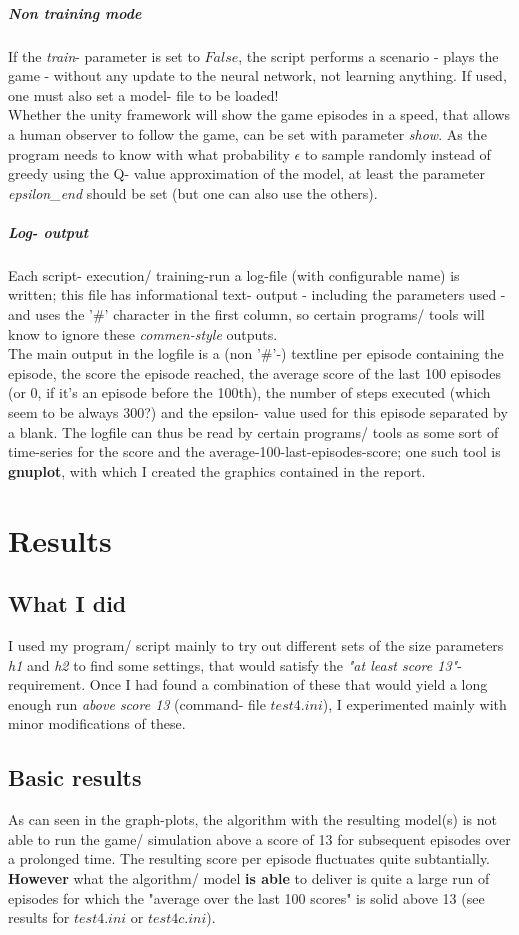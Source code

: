 \documentclass{article}
\begin{document}
\subparagraph{Non training mode}
If the \textit{train}- parameter is set to $False$, the script performs
a scenario - plays the game - without any update to the neural network,
not learning anything. If used, one must also set a model- file to be loaded!
\\
Whether the unity framework will show the game episodes in a speed, that allows
a human observer to follow the game, can be set with parameter \textit{show}.
As the program needs to know with what probability $\epsilon$ to sample randomly
instead of greedy using the Q- value approximation of the model, at least
the parameter \textit{epsilon\_end} should be set (but one can also use the
others).

\subparagraph{Log- output}
Each script- execution/ training-run a log-file (with configurable name) is
written; this file has informational text- output - including the parameters used -
and uses the '\#' character in the first column, so certain programs/ tools will
know to ignore these \textit{commen-style} outputs.
\\
The main output in the logfile is a (non '\#'-) textline per episode containing
the episode, the score the episode reached, the average score of the last 100
episodes (or 0, if it's an episode before the 100th), the number of steps executed
(which seem to be always 300?) and the epsilon- value used for this episode
separated by a blank.
The logfile can thus be read by certain programs/ tools as some sort
of time-series for the score and the average-100-last-episodes-score; one such
tool is \textbf{gnuplot}, with which I created the graphics contained in the report.

\section{Results} \label{res}
\subsection{What I did}
I used my program/ script mainly to try out different sets of the size parameters
\textit{h1} and \textit{h2} to find some settings, that would satisfy the
\textit{"at least score 13"}- requirement. Once I had found a combination of these
that would yield a long enough run \textit{above score 13} (command- file $test4.ini$),
I experimented mainly with minor modifications of these.

\subsection{Basic results}
As can seen in the graph-plots, the algorithm with the resulting model(s)
is not able to run the game/ simulation above a score of 13 for subsequent episodes
over a prolonged time. The resulting score per episode fluctuates quite subtantially.
\\
\textbf{However} what the algorithm/ model \textbf{is able} to deliver is quite a
large run of episodes for which the "average over the last 100 scores" is solid
above 13 (see results for $test4.ini$ or $test4c.ini$).
\end{document}
